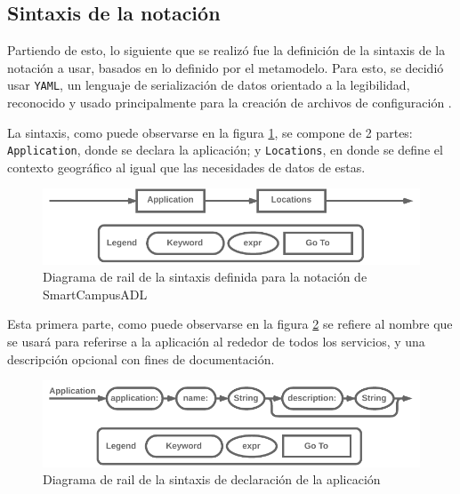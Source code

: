 \subsection{Sintaxis de la notación}

Partiendo de esto, lo siguiente que se realizó fue la definición de la sintaxis de la notación a usar, basados en lo definido por el metamodelo. Para esto, se decidió usar \texttt{YAML}, un lenguaje de serialización de datos orientado a la legibilidad, reconocido y usado principalmente para la creación de archivos de configuración \cite{YAML2023}. 

La sintaxis, como puede observarse en la figura \ref{fig:rail-base}, se compone de 2 partes: \texttt{Application}, donde se declara la aplicación; y \texttt{Locations}, en donde se define el contexto geográfico al igual que las necesidades de datos de estas.

\begin{figure}[H]
    \centering
    \caption{Diagrama de rail de la sintaxis definida para la notación de SmartCampusADL}
    \label{fig:rail-base}
    \vspace{2mm}
    \includegraphics[width=\linewidth]{images/Railroad Base.pdf}
\end{figure}

Esta primera parte, como puede observarse en la figura \ref{fig:rail-app} se refiere al nombre que se usará para referirse a la aplicación al rededor de todos los servicios, y una descripción opcional con fines de documentación.

\begin{figure}[H]
    \centering
    \caption{Diagrama de rail de la sintaxis de declaración de la aplicación}
    \label{fig:rail-app}
    \vspace{2mm}
    \includegraphics[width=\linewidth]{images/Railroad Application.pdf}
\end{figure}


